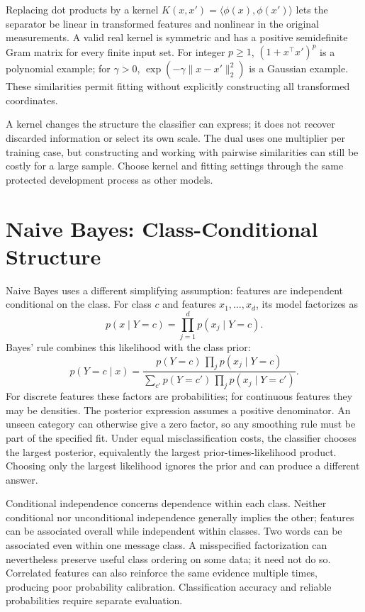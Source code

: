 Replacing dot products by a kernel $K(x,x')=\langle\phi(x),\phi(x')\rangle$ lets the separator be linear in transformed features and nonlinear in the original measurements. A valid real kernel is symmetric and has a positive semidefinite Gram matrix for every finite input set. For integer $p\ge1$, $(1+x^\top x')^p$ is a polynomial example; for $\gamma>0$, $\exp(-\gamma\|x-x'\|_2^2)$ is a Gaussian example. These similarities permit fitting without explicitly constructing all transformed coordinates.

A kernel changes the structure the classifier can express; it does not recover discarded information or select its own scale. The dual uses one multiplier per training case, but constructing and working with pairwise similarities can still be costly for a large sample. Choose kernel and fitting settings through the same protected development process as other models.

\section{Naive Bayes: Class-Conditional Structure}
\label{sec:naive-bayes-ch4}

Naive Bayes uses a different simplifying assumption: features are independent conditional on the class. For class $c$ and features $x_1,\ldots,x_d$, its model factorizes as
\[
p(x\mid Y=c)=\prod_{j=1}^d p(x_j\mid Y=c).
\]
Bayes' rule combines this likelihood with the class prior:
\[
p(Y=c\mid x)=\frac{p(Y=c)\,\prod_jp(x_j\mid Y=c)}
{\sum_{c'}p(Y=c')\,\prod_jp(x_j\mid Y=c')}.
\]
For discrete features these factors are probabilities; for continuous features they may be densities. The posterior expression assumes a positive denominator. An unseen category can otherwise give a zero factor, so any smoothing rule must be part of the specified fit. Under equal misclassification costs, the classifier chooses the largest posterior, equivalently the largest prior-times-likelihood product. Choosing only the largest likelihood ignores the prior and can produce a different answer.

Conditional independence concerns dependence within each class. Neither conditional nor unconditional independence generally implies the other; features can be associated overall while independent within classes. Two words can be associated even within one message class. A misspecified factorization can nevertheless preserve useful class ordering on some data; it need not do so. Correlated features can also reinforce the same evidence multiple times, producing poor probability calibration. Classification accuracy and reliable probabilities require separate evaluation.

